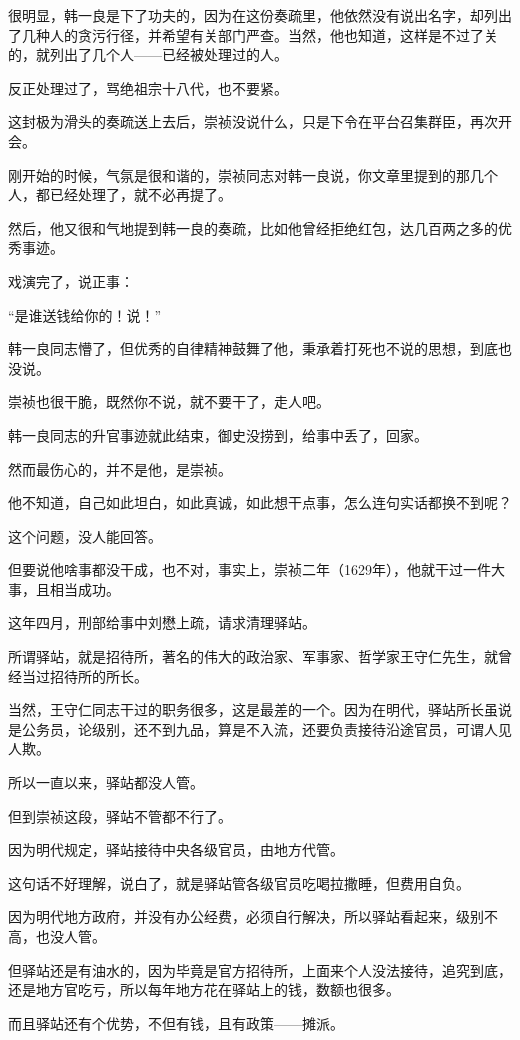 \begin{multicols}{\theparacolNo}
很明显，韩一良是下了功夫的，因为在这份奏疏里，他依然没有说出名字，却列出了几种人的贪污行径，并希望有关部门严查。当然，他也知道，这样是不过了关的，就列出了几个人——已经被处理过的人。

反正处理过了，骂绝祖宗十八代，也不要紧。

这封极为滑头的奏疏送上去后，崇祯没说什么，只是下令在平台召集群臣，再次开会。

刚开始的时候，气氛是很和谐的，崇祯同志对韩一良说，你文章里提到的那几个人，都已经处理了，就不必再提了。

然后，他又很和气地提到韩一良的奏疏，比如他曾经拒绝红包，达几百两之多的优秀事迹。

戏演完了，说正事：

“是谁送钱给你的！说！”

韩一良同志懵了，但优秀的自律精神鼓舞了他，秉承着打死也不说的思想，到底也没说。

崇祯也很干脆，既然你不说，就不要干了，走人吧。

韩一良同志的升官事迹就此结束，御史没捞到，给事中丢了，回家。

然而最伤心的，并不是他，是崇祯。

他不知道，自己如此坦白，如此真诚，如此想干点事，怎么连句实话都换不到呢？

这个问题，没人能回答。

但要说他啥事都没干成，也不对，事实上，崇祯二年（1629年），他就干过一件大事，且相当成功。

这年四月，刑部给事中刘懋上疏，请求清理驿站。

所谓驿站，就是招待所，著名的伟大的政治家、军事家、哲学家王守仁先生，就曾经当过招待所的所长。

当然，王守仁同志干过的职务很多，这是最差的一个。因为在明代，驿站所长虽说是公务员，论级别，还不到九品，算是不入流，还要负责接待沿途官员，可谓人见人欺。

所以一直以来，驿站都没人管。

但到崇祯这段，驿站不管都不行了。

因为明代规定，驿站接待中央各级官员，由地方代管。

这句话不好理解，说白了，就是驿站管各级官员吃喝拉撒睡，但费用自负。

因为明代地方政府，并没有办公经费，必须自行解决，所以驿站看起来，级别不高，也没人管。

但驿站还是有油水的，因为毕竟是官方招待所，上面来个人没法接待，追究到底，还是地方官吃亏，所以每年地方花在驿站上的钱，数额也很多。

而且驿站还有个优势，不但有钱，且有政策——摊派。


\end{multicols}
